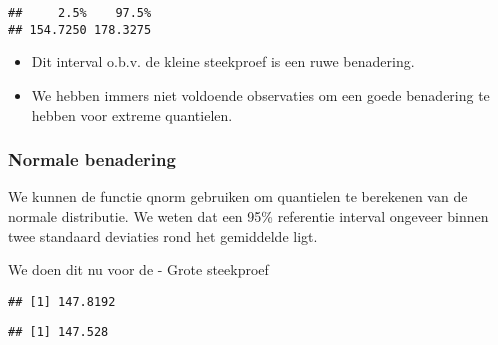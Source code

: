 \documentclass[
  12pt,dutch,coursenotes]{book}
\newenvironment{Shaded}{\begin{snugshade}}{\end{snugshade}}
\newcommand{\DataTypeTok}[1]{\textcolor[rgb]{0.13,0.29,0.53}{#1}}
\newcommand{\DecValTok}[1]{\textcolor[rgb]{0.00,0.00,0.81}{#1}}
\newcommand{\FloatTok}[1]{\textcolor[rgb]{0.00,0.00,0.81}{#1}}
\newcommand{\KeywordTok}[1]{\textcolor[rgb]{0.13,0.29,0.53}{\textbf{#1}}}
\newcommand{\NormalTok}[1]{#1}
\newcommand{\OperatorTok}[1]{\textcolor[rgb]{0.81,0.36,0.00}{\textbf{#1}}}
\newcommand{\StringTok}[1]{\textcolor[rgb]{0.31,0.60,0.02}{#1}}
\providecommand{\tightlist}{%
  \setlength{\itemsep}{0pt}\setlength{\parskip}{0pt}}
\theoremstyle{definition}
\theoremstyle{definition}
\theoremstyle{definition}
\theoremstyle{remark}
\begin{document}
\begin{verbatim}
##     2.5%    97.5% 
## 154.7250 178.3275
\end{verbatim}

\begin{itemize}
\tightlist
\item
  Dit interval o.b.v. de kleine steekproef is een ruwe benadering.
\item
  We hebben immers niet voldoende observaties om een goede benadering te hebben voor extreme quantielen.
\end{itemize}

\hypertarget{normale-benadering-1}{%
\subsubsection{Normale benadering}\label{normale-benadering-1}}

We kunnen de functie qnorm gebruiken om quantielen te berekenen van de normale distributie. We weten dat een 95\% referentie interval ongeveer binnen twee standaard deviaties rond het gemiddelde ligt.

We doen dit nu voor de
- Grote steekproef

\begin{Shaded}
\end{Shaded}

\begin{verbatim}
## [1] 147.8192
\end{verbatim}

\begin{Shaded}
\end{Shaded}

\begin{verbatim}
## [1] 147.528
\end{verbatim}

\begin{Shaded}
\end{Shaded}
\end{document}
